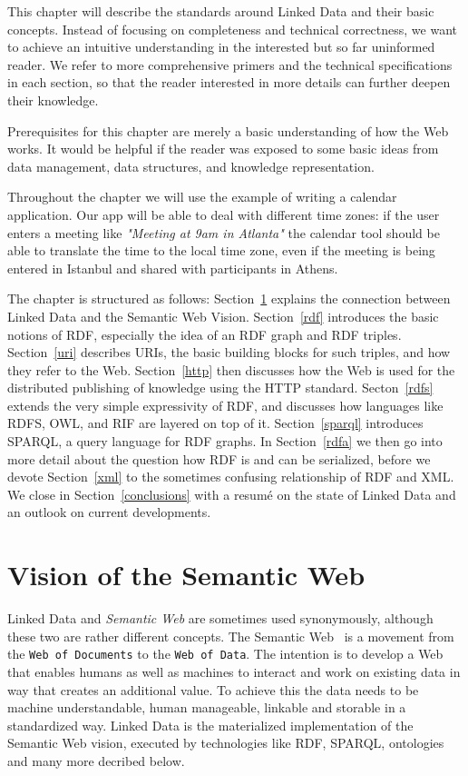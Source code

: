 \documentclass{IOS-Book-Article}
\begin{document}
This chapter will describe the standards around Linked Data and their basic concepts.
Instead of focusing on completeness and technical correctness, we want to achieve an intuitive understanding in the interested but so far uninformed reader.
We refer to more comprehensive primers and the technical specifications in each section, so that the reader interested in more details can further deepen their knowledge.

Prerequisites for this chapter are merely a basic understanding of how the Web works.
It would be helpful if the reader was exposed to some basic ideas from data management, data structures, and knowledge representation.

Throughout the chapter we will use the example of writing a calendar application.
Our app will be able to deal with different time zones:
if the user enters a meeting like \textit{"Meeting at 9am in Atlanta"} the calendar tool should be able to translate the time to the local time zone, even if the meeting is being entered in Istanbul and shared with participants in Athens.

The chapter is structured as follows:
Section~\ref{semanticweb} explains the connection between Linked Data and the Semantic Web Vision.
Section~\ref{rdf} introduces the basic notions of RDF, especially the idea of an RDF graph and RDF triples.
Section~\ref{uri} describes URIs, the basic building blocks for such triples, and how they refer to the Web.
Section~\ref{http} then discusses how the Web is used for the distributed publishing of knowledge using the HTTP standard.
Secton~\ref{rdfs} extends the very simple expressivity of RDF, and discusses how languages like RDFS, OWL, and RIF are layered on top of it.
Section~\ref{sparql} introduces SPARQL, a query language for RDF graphs.
In Section~\ref{rdfa} we then go into more detail about the question how RDF is and can be serialized,
before we devote Section~\ref{xml} to the sometimes confusing relationship of RDF and XML.
We close in Section~\ref{conclusions} with a resum\'{e} on the state of Linked Data and an outlook on current developments.

\section{Vision of the Semantic Web}
\label{semanticweb}

Linked Data and \emph{Semantic Web} are sometimes used synonymously, although these two are rather different concepts.
The Semantic Web~\cite{semanticWeb} is a movement from the \texttt{Web of Documents} to the \texttt{Web of Data}.
The intention is to develop a Web that enables humans as well as machines to interact and work on existing data in way that creates an additional value.
To achieve this the data needs to be machine understandable, human manageable, linkable and storable in a standardized way.
Linked Data is the materialized implementation of the Semantic Web vision, executed by technologies like RDF, SPARQL, ontologies and many more decribed below.
\end{document}
